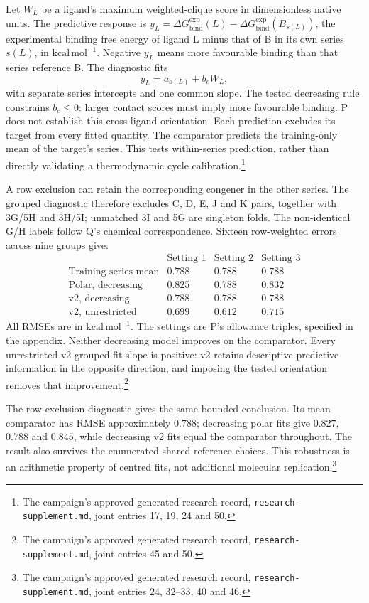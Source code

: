 \documentclass{article}
\newcommand{\rr}[1]{\footnote{The campaign's approved generated research record, \texttt{research-supplement.md}, #1.}}
\begin{document}
Let \(W_L\) be a ligand's maximum weighted-clique score in dimensionless native units. The predictive response is \(y_L=\Delta G_{\mathrm{bind}}^{\mathrm{exp}}(L)-\Delta G_{\mathrm{bind}}^{\mathrm{exp}}(B_{s(L)})\), the experimental binding free energy of ligand L minus that of B in its own series \(s(L)\), in \(\mathrm{kcal\,mol^{-1}}\). Negative \(y_L\) means more favourable binding than that series reference B. The diagnostic fits
\[
 y_L=a_{s(L)}+b_cW_L,
\]
with separate series intercepts and one common slope. The tested decreasing rule constrains \(b_c\leq0\): larger contact scores must imply more favourable binding. P does not establish this cross-ligand orientation. Each prediction excludes its target from every fitted quantity. The comparator predicts the training-only mean of the target's series. This tests within-series prediction, rather than directly validating a thermodynamic cycle calibration.\rr{joint entries 17, 19, 24 and 50}

A row exclusion can retain the corresponding congener in the other series. The grouped diagnostic therefore excludes C, D, E, J and K pairs, together with 3G/5H and 3H/5I; unmatched 3I and 5G are singleton folds. The non-identical G/H labels follow Q's chemical correspondence.\cite{Q} Sixteen row-weighted errors across nine groups give:
\[
\begin{array}{c|rrr}
 & \text{Setting 1} & \text{Setting 2} & \text{Setting 3}\\ \hline
\text{Training series mean} & 0.788 & 0.788 & 0.788\\
\text{Polar, decreasing} & 0.825 & 0.788 & 0.832\\
\text{v2, decreasing} & 0.788 & 0.788 & 0.788\\
\text{v2, unrestricted} & 0.699 & 0.612 & 0.715
\end{array}
\]
All RMSEs are in \(\mathrm{kcal\,mol^{-1}}\). The settings are P's allowance triples, specified in the appendix. Neither decreasing model improves on the comparator. Every unrestricted v2 grouped-fit slope is positive: v2 retains descriptive predictive information in the opposite direction, and imposing the tested orientation removes that improvement.\rr{joint entries 45 and 50}

The row-exclusion diagnostic gives the same bounded conclusion. Its mean comparator has RMSE approximately \(0.788\); decreasing polar fits give \(0.827\), \(0.788\) and \(0.845\), while decreasing v2 fits equal the comparator throughout. The result also survives the enumerated shared-reference choices. This robustness is an arithmetic property of centred fits, not additional molecular replication.\rr{joint entries 24, 32--33, 40 and 46}
\end{document}
